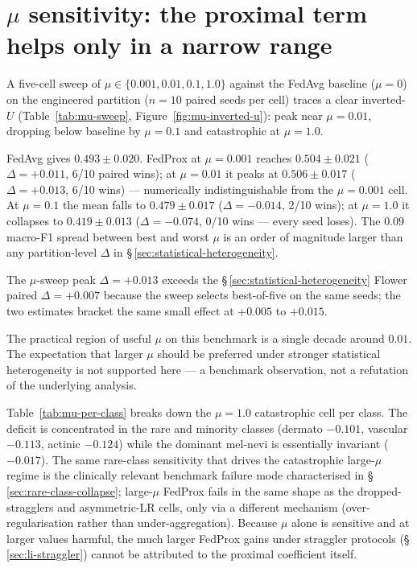 
\section{$\mu$ sensitivity: the proximal term helps only in a narrow range}
\label{sec:mu-sensitivity}

A five-cell sweep of $\mu \in \{0.001, 0.01, 0.1, 1.0\}$ against the FedAvg
baseline ($\mu = 0$) on the engineered partition ($n=10$ paired seeds per
cell) traces a clear inverted-$U$ (Table~\ref{tab:mu-sweep},
Figure~\ref{fig:mu-inverted-u}): peak near $\mu = 0.01$, dropping below
baseline by $\mu = 0.1$ and catastrophic at $\mu = 1.0$.

FedAvg gives $0.493 \pm 0.020$. FedProx at $\mu = 0.001$ reaches
$0.504 \pm 0.021$ ($\Delta = +0.011$, 6/10 paired wins); at $\mu = 0.01$ it
peaks at $0.506 \pm 0.017$ ($\Delta = +0.013$, 6/10 wins) --- numerically
indistinguishable from the $\mu = 0.001$ cell. At $\mu = 0.1$ the mean falls
to $0.479 \pm 0.017$ ($\Delta = -0.014$, 2/10 wins); at $\mu = 1.0$ it
collapses to $0.419 \pm 0.013$ ($\Delta = -0.074$, 0/10 wins --- every seed
loses). The $0.09$ macro-F1 spread between best and worst $\mu$ is an order
of magnitude larger than any partition-level $\Delta$ in
\S\,\ref{sec:statistical-heterogeneity}.

The $\mu$-sweep peak $\Delta = +0.013$ exceeds the
\S\,\ref{sec:statistical-heterogeneity} Flower paired $\Delta = +0.007$
because the sweep selects best-of-five on the same seeds; the two estimates
bracket the same small effect at $+0.005$ to $+0.015$.

The practical region of useful $\mu$ on this benchmark is a single decade
around $0.01$. The expectation that larger $\mu$ should be preferred under
stronger statistical heterogeneity is not supported here --- a benchmark
observation, not a refutation of the underlying analysis.

Table~\ref{tab:mu-per-class} breaks down the $\mu = 1.0$ catastrophic cell
per class. The deficit is concentrated in the rare and minority classes
(dermato $-0.101$, vascular $-0.113$, actinic $-0.124$) while the dominant
mel-nevi is essentially invariant ($-0.017$). The same rare-class
sensitivity that drives the catastrophic large-$\mu$ regime is the
clinically relevant benchmark failure mode characterised in
\S\,\ref{sec:rare-class-collapse}; large-$\mu$ FedProx fails in the same
shape as the dropped-stragglers and asymmetric-LR cells, only via a
different mechanism (over-regularisation rather than under-aggregation).
Because $\mu$ alone is sensitive and at larger values harmful, the much
larger FedProx gains under straggler protocols
(\S\,\ref{sec:li-straggler}) cannot be attributed to the proximal
coefficient itself.


